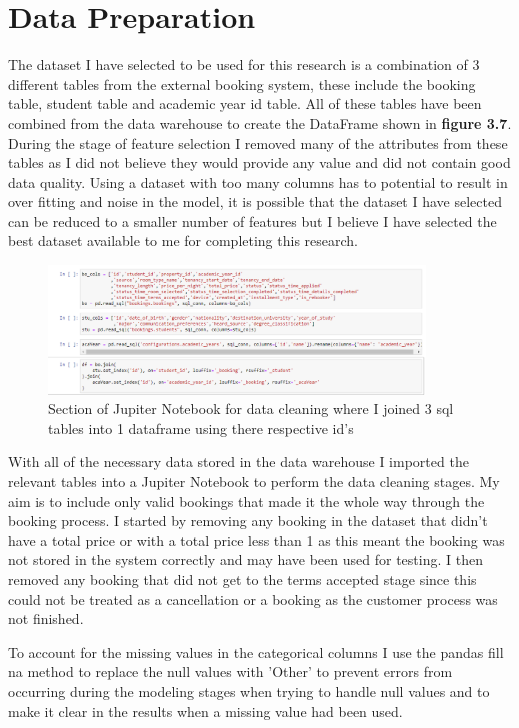 \section{Data Preparation}

The dataset I have selected to be used for this research is a combination of 3 different tables from the external booking system, these include the booking table, student table and academic year id table. All of these tables have been combined from the data warehouse to create the DataFrame shown in \textbf{figure 3.7}. During the stage of feature selection I removed many of the attributes from these tables as I did not believe they would provide any value and did not contain good data quality. Using a dataset with too many columns has to potential to result in over fitting and noise in the model, it is possible that the dataset I have selected can be reduced to a smaller number of features but I believe I have selected the best dataset available to me for completing this research. 

\begin{figure}[H]
 \includegraphics[width=10cm]{figures/joining_tables.png}
 \caption{Section of Jupiter Notebook for data cleaning where I joined 3 sql tables into 1 dataframe using there respective id's}
\end{figure}

With all of the necessary data stored in the data warehouse I imported the relevant tables into a Jupiter Notebook to perform the data cleaning stages. My aim is to include only valid bookings that made it the whole way through the booking process. I started by removing any booking in the dataset that didn't have a total price or with a total price less than 1 as this meant the booking was not stored in the system correctly and may have been used for testing. I then removed any booking that did not get to the terms accepted stage since this could not be treated as a cancellation or a booking as the customer process was not finished.

To account for the missing values in the categorical columns I use the pandas fill na method to replace the null values with 'Other'  to prevent errors from occurring during the modeling stages when trying to handle null values and to make it clear in the results when a missing value had been used.

